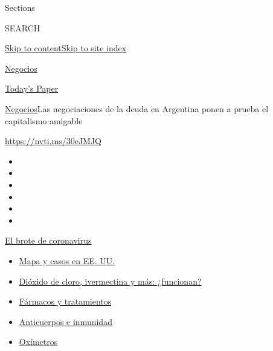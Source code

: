 Sections

SEARCH

\protect\hyperlink{site-content}{Skip to
content}\protect\hyperlink{site-index}{Skip to site index}

\href{https://www.nytimes.com/es/section/negocios}{Negocios}

\href{https://myaccount.nytimes.com/auth/login?response_type=cookie\&client_id=vi}{}

\href{https://www.nytimes.com/section/todayspaper}{Today's Paper}

\href{/es/section/negocios}{Negocios}\textbar{}Las negociaciones de la
deuda en Argentina ponen a prueba el capitalismo amigable

\url{https://nyti.ms/30eJMJQ}

\begin{itemize}
\item
\item
\item
\item
\item
\item
\end{itemize}

\href{https://www.nytimes.com/es/spotlight/coronavirus?action=click\&pgtype=Article\&state=default\&region=TOP_BANNER\&context=storylines_menu}{El
brote de coronavirus}

\begin{itemize}
\tightlist
\item
  \href{https://www.nytimes.com/es/interactive/2020/espanol/mundo/coronavirus-en-estados-unidos.html?action=click\&pgtype=Article\&state=default\&region=TOP_BANNER\&context=storylines_menu}{Mapa
  y casos en EE. UU.}
\item
  \href{https://www.nytimes.com/es/2020/07/23/espanol/america-latina/bolivia-cloro-coronavirus-ivermectina.html?action=click\&pgtype=Article\&state=default\&region=TOP_BANNER\&context=storylines_menu}{Dióxido
  de cloro, ivermectina y más: ¿funcionan?}
\item
  \href{https://www.nytimes.com/es/interactive/2020/science/coronavirus-tratamientos-curas.html?action=click\&pgtype=Article\&state=default\&region=TOP_BANNER\&context=storylines_menu}{Fármacos
  y tratamientos}
\item
  \href{https://www.nytimes.com/es/2020/07/28/espanol/ciencia-y-tecnologia/anticuerpos-coronavirus-inmunidad.html?action=click\&pgtype=Article\&state=default\&region=TOP_BANNER\&context=storylines_menu}{Anticuerpos
  e inmunidad}
\item
  \href{https://www.nytimes.com/es/2020/04/29/espanol/estilos-de-vida/oximetro-para-que-sirve.html?action=click\&pgtype=Article\&state=default\&region=TOP_BANNER\&context=storylines_menu}{Oxímetros}
\end{itemize}

